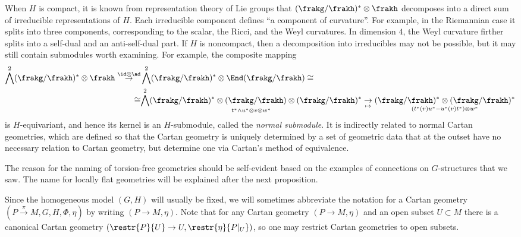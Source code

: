 \begin{example}
    When $H$ is compact, it is known from representation theory of Lie groups that $(\frakg\slash\frakh)^\ast\otimes\frakh$ decomposes into a direct sum of irreducible representations of $H$. Each irreducible component defines ``a component of curvature''. For example, in the Riemannian case it splits into three components, corresponding to the scalar, the Ricci, and the Weyl curvatures. In dimension $4$, the Weyl curvature firther splits into a self-dual and an anti-self-dual part. If $H$ is noncompact, then a decomposition into irreducibles may not be possible, but it may still contain submodules worth examining. For example, the composite mapping 
    \begin{align}
        \bigwedge^2(\frakg\slash\frakh)^\ast\otimes\frakh\overset{\id\otimes \ad}{\to}&\bigwedge^2(\frakg\slash\frakh)^\ast\otimes\End(\frakg\slash\frakh)\cong \\
        \cong &\underset{t^\ast\wedge u^\ast\otimes v\otimes w^\ast}{\bigwedge^2(\frakg\slash\frakh)^\ast\otimes(\frakg\slash\frakh)\otimes (\frakg\slash\frakh)^\ast}
        \underset{\mapsto}{\to} \underset{(t^\ast(v)u^\ast-u^\ast(v)t^\ast)\otimes w^\ast}{(\frakg\slash\frakh)^\ast\otimes (\frakg\slash\frakh)^\ast}
    \end{align}
    is $H$-equivariant, and hence its kernel is an $H$-submodule, called the \emph{normal submodule}. It is indirectly related to normal Cartan geometries, which are defined so that the Cartan geometry is uniquely determined by a set of geometric data that at the outset have no necessary relation to Cartan geometry, but determine one via Cartan's method of equivalence.
\end{example}

The reason for the naming of torsion-free geometries should be self-evident based on the examples of connections on $G$-structures that we saw. The name for locally flat geometries will be explained after the next proposition.

Since the homogeneous model $(G,H)$ will usually be fixed, we will sometimes abbreviate the notation for a Cartan geometry $(P\overset{\pi}{\to} M,G,H,\Phi,\eta)$ by writing $(P\to M,\eta)$. Note that for any Cartan geometry $(P\to M,\eta)$ and an open subset $U\subset M$ there is a canonical Cartan geometry $\left(\restr{P}{U}\to U,\restr{\eta}{P|_U}\right)$, so one may restrict Cartan geometries to open subsets.

